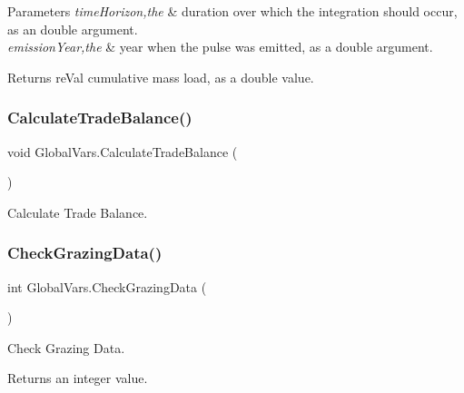 \begin{DoxyParams}{Parameters}
{\em time\+Horizon,the} & duration over which the integration should occur, as an double argument. \\
\hline
{\em emission\+Year,the} & year when the pulse was emitted, as a double argument. \\
\hline
\end{DoxyParams}
\begin{DoxyReturn}{Returns}
re\+Val cumulative mass load, as a double value. 
\end{DoxyReturn}
\mbox{\label{class_global_vars_a8829945aaadcc14efa19328c512c3a43}} 
\subsubsection{\texorpdfstring{CalculateTradeBalance()}{CalculateTradeBalance()}}
{\footnotesize\ttfamily void Global\+Vars.\+Calculate\+Trade\+Balance (\begin{DoxyParamCaption}{ }\end{DoxyParamCaption})\hspace{0.3cm}{\ttfamily [inline]}}



Calculate Trade Balance. 

\mbox{\label{class_global_vars_ad893d360c7c5ac004598509b57351d90}} 
\subsubsection{\texorpdfstring{CheckGrazingData()}{CheckGrazingData()}}
{\footnotesize\ttfamily int Global\+Vars.\+Check\+Grazing\+Data (\begin{DoxyParamCaption}{ }\end{DoxyParamCaption})\hspace{0.3cm}{\ttfamily [inline]}}



Check Grazing Data. 

\begin{DoxyReturn}{Returns}
an integer value. 
\end{DoxyReturn}
\mbox{\label{class_global_vars_a6251df0946f189d52366f2fe300cc2dd}} 
